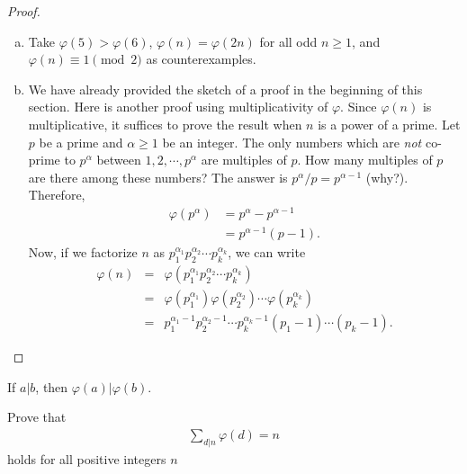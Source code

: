 \documentclass[12pt]{subfile}
\begin{document}
\begin{proof}
\begin{enumerate}[(a)]
				\item Take $\varphi(5)>\varphi(6)$, $\varphi(n)=\varphi(2n)$ for all odd $n\geq 1$, and $\varphi(n) \equiv 1 \pmod 2$ as counterexamples.
				
				\item We have already provided the sketch of a proof in the beginning of this section. Here is another proof using multiplicativity of $\varphi$. Since $\varphi(n)$ is multiplicative, it suffices to prove the result when $n$ is a power of a prime. Let $p$ be a prime and $\alpha \geq 1$ be an integer. The only numbers which are \textit{not} co-prime to $p^\alpha$ between $1,2,\cdots,p^\alpha$ are multiples of $p$. How many multiples of $p$ are there among these numbers? The answer is $p^\alpha/p=p^{\alpha-1}$ (why?). Therefore,
					\begin{align*}
						\varphi(p^\alpha) &= p^\alpha - p^{\alpha -1}\\
						&= p^{\alpha -1} (p-1).
					\end{align*}
				Now, if we factorize $n$ as $p_1^{\alpha_1} p_2^{\alpha_2} \cdots p_k^{\alpha_k}$, we can write
					\begin{eqnarray*}
						\varphi(n) &=& \varphi(p_1^{\alpha_1} p_2^{\alpha_2} \cdots p_k^{\alpha_k})\\
								   &=& \varphi(p_1^{\alpha_1}) \varphi(p_2^{\alpha_2}) \cdots \varphi(p_k^{\alpha_k})\\
								   &=& p_1^{\alpha_1-1} p_2^{\alpha_2-1} \cdots p_k^{\alpha_k-1} \left( p_1 -1 \right) \cdots \left( p_k -1 \right).
					\end{eqnarray*}
			\end{enumerate}
		\end{proof}
	
		\begin{corollary}\label{cor:phidiv}
			If $a|b$, then $\varphi(a)|\varphi(b)$.	
		\end{corollary}
	
		\begin{theorem}\label{thm:phi*1}
			Prove that
				\begin{align*}
					\sum_{d|n} \varphi(d)=n
				\end{align*}
			holds for all positive integers $n$
		\end{theorem}
		
\end{document}
